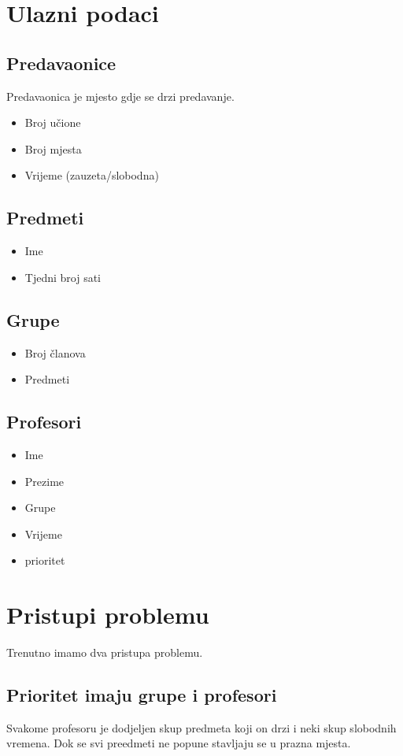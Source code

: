 \section{Ulazni podaci}
  \subsection{Predavaonice}
  Predavaonica je mjesto gdje se drzi predavanje.
    \begin{itemize}
      \item Broj učione
      \item Broj mjesta
      \item Vrijeme (zauzeta/slobodna)
    \end{itemize}
  \subsection{Predmeti}
    \begin{itemize}
      \item Ime
      \item Tjedni broj sati
    \end{itemize}
  \subsection{Grupe}
    \begin{itemize}
      \item Broj članova
      \item Predmeti
    \end{itemize}
  \subsection{Profesori}
    \begin{itemize}
      \item Ime
      \item Prezime
      \item Grupe
      \item Vrijeme
      \item prioritet
    \end{itemize}

\section{Pristupi problemu}
    Trenutno imamo dva pristupa problemu.
    \subsection{Prioritet imaju grupe i profesori}
    Svakome profesoru je dodjeljen skup predmeta koji on drzi i neki skup slobodnih vremena. Dok se svi preedmeti ne popune stavljaju se u prazna mjesta.
